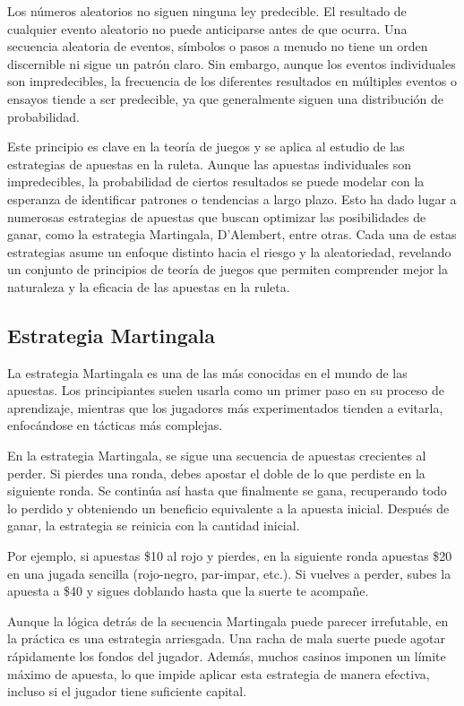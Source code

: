 \documentclass{article}
\begin{document}
Los números aleatorios no siguen ninguna ley predecible. El resultado de cualquier evento aleatorio no puede anticiparse antes de que ocurra. Una secuencia aleatoria de eventos, símbolos o pasos a menudo no tiene un orden discernible ni sigue un patrón claro. Sin embargo, aunque los eventos individuales son impredecibles, la frecuencia de los diferentes resultados en múltiples eventos o ensayos tiende a ser predecible, ya que generalmente siguen una distribución de probabilidad.

Este principio es clave en la teoría de juegos y se aplica al estudio de las estrategias de apuestas en la ruleta. Aunque las apuestas individuales son impredecibles, la probabilidad de ciertos resultados se puede modelar con la esperanza de identificar patrones o tendencias a largo plazo. Esto ha dado lugar a numerosas estrategias de apuestas que buscan optimizar las posibilidades de ganar, como la estrategia Martingala, D'Alembert, entre otras. Cada una de estas estrategias asume un enfoque distinto hacia el riesgo y la aleatoriedad, revelando un conjunto de principios de teoría de juegos que permiten comprender mejor la naturaleza y la eficacia de las apuestas en la ruleta.

\subsection{Estrategia Martingala}
La estrategia Martingala es una de las más conocidas en el mundo de las apuestas. Los principiantes suelen usarla como un primer paso en su proceso de aprendizaje, mientras que los jugadores más experimentados tienden a evitarla, enfocándose en tácticas más complejas.

En la estrategia Martingala, se sigue una secuencia de apuestas crecientes al perder. Si pierdes una ronda, debes apostar el doble de lo que perdiste en la siguiente ronda. Se continúa así hasta que finalmente se gana, recuperando todo lo perdido y obteniendo un beneficio equivalente a la apuesta inicial. Después de ganar, la estrategia se reinicia con la cantidad inicial.

Por ejemplo, si apuestas \$10 al rojo y pierdes, en la siguiente ronda apuestas \$20 en una jugada sencilla (rojo-negro, par-impar, etc.). Si vuelves a perder, subes la apuesta a \$40 y sigues doblando hasta que la suerte te acompañe.

Aunque la lógica detrás de la secuencia Martingala puede parecer irrefutable, en la práctica es una estrategia arriesgada. Una racha de mala suerte puede agotar rápidamente los fondos del jugador. Además, muchos casinos imponen un límite máximo de apuesta, lo que impide aplicar esta estrategia de manera efectiva, incluso si el jugador tiene suficiente capital.
\end{document}
